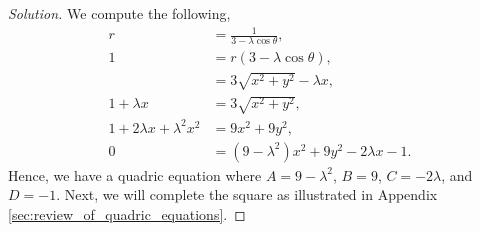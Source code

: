 \documentclass[letterpaper, 12pt]{amsart}
\theoremstyle{definition}  							%
\begin{document}
		\begin{proof}[Solution]
		We compute the following,
			\begin{align*}
				r &= \frac{1}{3-\lambda\cos\theta}, \\
				1 &= r(3-\lambda\cos\theta), \\
				&= 3\sqrt{x^2+y^2} - \lambda x, \\
				1 + \lambda x &= 3\sqrt{x^2+y^2}, \\
				1 + 2\lambda x + \lambda^2x^2 &= 9x^2 + 9y^2, \\
				0 &= \left( 9 - \lambda^2 \right)x^{2} + 9y^2 - 2\lambda x - 1.
			\end{align*}
		Hence, we have a quadric equation where $A = 9 - \lambda^2$, $B = 9$, $C = -2\lambda$, and $D = -1$.
		Next, we will complete the square as illustrated in Appendix \ref{sec:review_of_quadric_equations}.


\end{proof}
\end{document}
